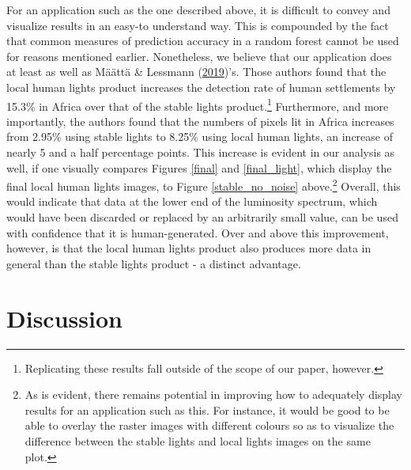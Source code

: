 \documentclass[11pt,preprint, authoryear]{elsarticle}
\numberwithin{equation}{section}
\numberwithin{figure}{section}
\numberwithin{table}{section}
\let\rmarkdownfootnote\footnote%
\def\footnote{\protect\rmarkdownfootnote}
\begin{document}
For an application such as the one described above, it is difficult to
convey and visualize results in an easy-to understand way. This is
compounded by the fact that common measures of prediction accuracy in a
random forest cannot be used for reasons mentioned earlier. Nonetheless,
we believe that our application does at least as well as Määttä \&
Lessmann (\protect\hyperlink{ref-maatta}{2019})'s. Those authors found
that the local human lights product increases the detection rate of
human settlements by 15.3\% in Africa over that of the stable lights
product.\footnote{Replicating these results fall outside of the scope of
  our paper, however.} Furthermore, and more importantly, the authors
found that the numbers of pixels lit in Africa increases from 2.95\%
using stable lights to 8.25\% using local human lights, an increase of
nearly 5 and a half percentage points. This increase is evident in our
analysis as well, if one visually compares Figures \ref{final} and
\ref{final_light}, which display the final local human lights images, to
Figure \ref{stable_no_noise} above.\footnote{As is evident, there
  remains potential in improving how to adequately display results for
  an application such as this. For instance, it would be good to be able
  to overlay the raster images with different colours so as to visualize
  the difference between the stable lights and local lights images on
  the same plot.} Overall, this would indicate that data at the lower
end of the luminosity spectrum, which would have been discarded or
replaced by an arbitrarily small value, can be used with confidence that
it is human-generated. Over and above this improvement, however, is that
the local human lights product also produces more data in general than
the stable lights product - a distinct advantage.

\hypertarget{discussion}{%
\section{\texorpdfstring{Discussion
\label{Discussion}}{Discussion }}\label{discussion}}
\end{document}
